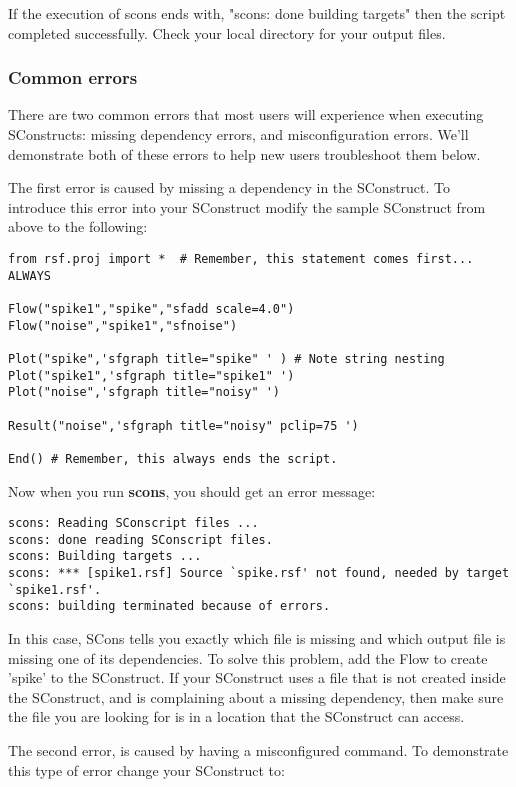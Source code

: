 If the execution of scons ends with, "scons: done building targets" then the script completed successfully.  Check your local directory for your output files. 

\subsubsection{Common errors}
There are two common errors that most users will experience when executing SConstructs: missing dependency errors, and misconfiguration errors.  We'll demonstrate both of these errors to help new users troubleshoot them below. 

 The first error is caused by missing a dependency in the SConstruct.  To introduce this error into your SConstruct modify the sample SConstruct from above to the following:

\begin{verbatim}
from rsf.proj import *  # Remember, this statement comes first... ALWAYS

Flow("spike1","spike","sfadd scale=4.0")
Flow("noise","spike1","sfnoise")

Plot("spike",'sfgraph title="spike" ' ) # Note string nesting
Plot("spike1",'sfgraph title="spike1" ') 
Plot("noise",'sfgraph title="noisy" ')

Result("noise",'sfgraph title="noisy" pclip=75 ')

End() # Remember, this always ends the script.
\end{verbatim}
Now when you run \textbf{scons}, you should get an error message:
\begin{verbatim}
scons: Reading SConscript files ...
scons: done reading SConscript files.
scons: Building targets ...
scons: *** [spike1.rsf] Source `spike.rsf' not found, needed by target `spike1.rsf'.
scons: building terminated because of errors.
\end{verbatim}
In this case, SCons tells you exactly which file is missing and which output file is missing one of its dependencies.  To solve this problem, add the Flow to create 'spike' to the SConstruct.  If your SConstruct uses a file that is not created inside the SConstruct, and is complaining about a missing dependency, then make sure the file you are looking for is in a location that the SConstruct can access.

The second error, is caused by having a misconfigured command.  To demonstrate this type of error change your SConstruct to:


